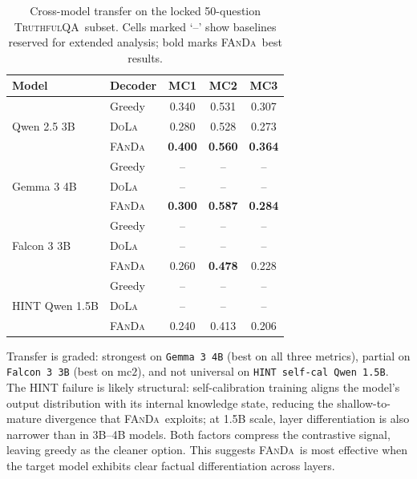 \documentclass[10pt,twocolumn,letterpaper]{article}
\newcommand{\fanda}{\textsc{FAnDa}}
\newcommand{\dola}{\textsc{DoLa}}
\newcommand{\truthfulqa}{\textsc{TruthfulQA}}
\begin{document}
\begin{table}[t]
    \centering
    \small
    \setlength{\tabcolsep}{4pt}
    \begin{tabular}{llccc}
        \toprule
        Model & Decoder & MC1 & MC2 & MC3 \\
        \midrule
        \multirow{3}{*}{Qwen 2.5 3B}   & Greedy & 0.340 & 0.531 & 0.307 \\
                                         & \dola  & 0.280 & 0.528 & 0.273 \\
                                         & \fanda & \textbf{0.400} & \textbf{0.560} & \textbf{0.364} \\
        \midrule
        \multirow{3}{*}{Gemma 3 4B}    & Greedy & -- & -- & -- \\
                                         & \dola  & -- & -- & -- \\
                                         & \fanda & \textbf{0.300} & \textbf{0.587} & \textbf{0.284} \\
        \midrule
        \multirow{3}{*}{Falcon 3 3B}   & Greedy & -- & -- & -- \\
                                         & \dola  & -- & -- & -- \\
                                         & \fanda & 0.260 & \textbf{0.478} & 0.228 \\
        \midrule
        \multirow{3}{*}{HINT Qwen 1.5B} & Greedy & -- & -- & -- \\
                                         & \dola  & -- & -- & -- \\
                                         & \fanda & 0.240 & 0.413 & 0.206 \\
        \bottomrule
    \end{tabular}
    \caption{Cross-model transfer on the locked 50-question \truthfulqa\ subset. Cells marked `--' show baselines reserved for extended analysis; bold marks \fanda\ best results.}
    \label{tab:transfer}
\end{table}

Transfer is graded: strongest on \texttt{Gemma~3~4B} (best on all three metrics), partial on \texttt{Falcon~3~3B} (best on $\mathrm{mc2}$), and not universal on \texttt{HINT self-cal Qwen~1.5B}. The HINT failure is likely structural: self-calibration training aligns the model's output distribution with its internal knowledge state, reducing the shallow-to-mature divergence that \fanda\ exploits; at 1.5B scale, layer differentiation is also narrower than in 3B--4B models. Both factors compress the contrastive signal, leaving greedy as the cleaner option. This suggests \fanda\ is most effective when the target model exhibits clear factual differentiation across layers.
\end{document}
